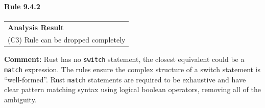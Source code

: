 \paragraph{Rule 9.4.2}
\begin{longtable}{p{13cm}}
\textbf{Analysis Result} \\
(C3) Rule can be dropped completely \\
\end{longtable}
\textbf{Comment:} Rust has no \texttt{switch} statement, the closest equivalent could be a \texttt{match} expression. The rules ensure the complex structure of a switch statement is ``well-formed''. Rust \texttt{match} statements are required to be exhaustive and have clear pattern matching syntax using logical boolean operators, removing all of the ambiguity. \\


